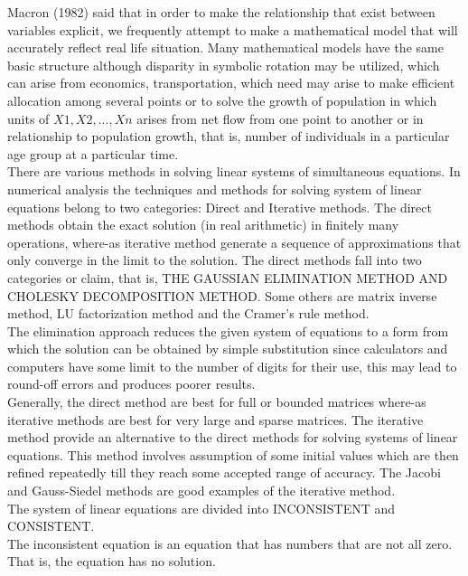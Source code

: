 \documentclass[a4paper, 12pt]{report}
\begin{document}
{Macron (1982) said that in order to make the relationship that exist between variables explicit, we frequently attempt to make a mathematical model that will accurately reflect real life situation. Many mathematical models have the same basic structure although disparity in symbolic rotation may be utilized, which can arise from economics, transportation, which need may arise to make efficient allocation among several points or to solve the growth of population in which units of $X1,X2,...,Xn$ arises from net flow from one point to another or in relationship to population growth, that is, number of individuals in a particular age group at a particular time.\\
 
There are various methods in solving linear systems of simultaneous equations. In numerical analysis the techniques and methods for solving system of linear equations belong to two categories: Direct and Iterative methods. The direct methods obtain the exact solution (in real arithmetic) in finitely many operations, where-as iterative method generate a sequence of approximations that only converge in the limit to the solution. The direct methods fall into two categories or claim, that is, THE GAUSSIAN ELIMINATION METHOD AND CHOLESKY DECOMPOSITION METHOD. Some others are matrix inverse method, LU factorization method and the Cramer's rule method.\\
     
The elimination approach reduces the given system of equations to a form from which the solution can be obtained by simple substitution since calculators and computers have some limit to the number of digits for their use, this may lead to round-off errors and produces poorer results.\\
   
Generally, the direct method are best for full or bounded matrices where-as iterative methods are best for very large and sparse matrices. The iterative method provide an alternative to the direct methods for solving systems of linear equations. This method involves assumption of some initial values which are then refined repeatedly till they reach some accepted range of accuracy. The Jacobi and Gauss-Siedel methods are good examples of the iterative method.\\
     
The system of linear equations are divided into INCONSISTENT and CONSISTENT.\\
     
The inconsistent equation is an equation that has numbers that are not all zero. That is, the equation has no solution.\\
     
}
\end{document}
